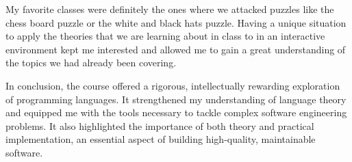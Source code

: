 \documentclass{article}
\theoremstyle{theorem}
\theoremstyle{definition}
\theoremstyle{remark}
\begin{document}
My favorite classes were definitely the ones where we attacked puzzles like the chess board puzzle or the white and black hats puzzle. 
Having a unique situation to apply the theories that we are learning about in class to in an interactive environment kept me
interested and allowed me to gain a great understanding of the topics we had already been covering. 

In conclusion, the course offered a rigorous, intellectually rewarding exploration of programming languages. It strengthened my understanding of language 
theory and equipped me with the tools necessary to tackle complex software engineering problems. It also highlighted the importance of both theory and practical 
implementation, an essential aspect of building high-quality, maintainable software.
\end{document}
